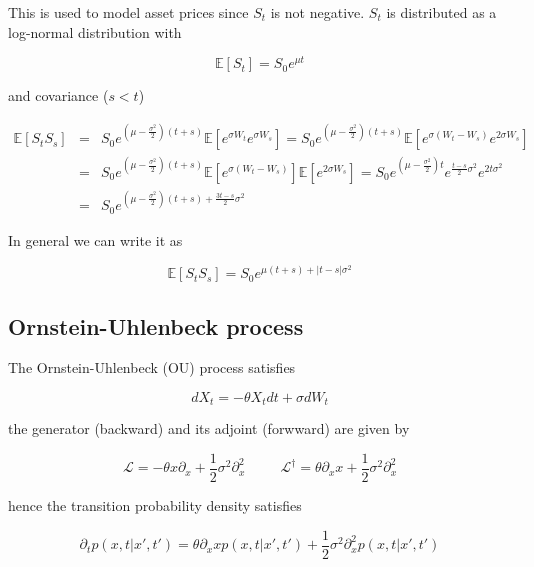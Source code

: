 \documentclass[11pt,a4paper]{article}
\begin{document}
This is used to model asset prices since $S_t$ is not negative. $S_t$ is distributed as a log-normal distribution with 

\begin{equation}
    \mathbb{E}[S_t] = S_0e^{\mu t}
\end{equation}

and covariance ($s<t$)

\begin{eqnarray}
    \mathbb{E}[S_tS_s] &=& S_0 e^{(\mu- \frac{\sigma^2}{2})(t+s)}\mathbb{E}[e^{\sigma W_t}e^{\sigma W_s}] = S_0e^{(\mu- \frac{\sigma^2}{2})(t+s)}\mathbb{E}[e^{\sigma(W_t-W_s)}e^{2\sigma W_s}] \nonumber \\
    &=&  S_0e^{(\mu- \frac{\sigma^2}{2})(t+s)}\mathbb{E}[e^{\sigma(W_t-W_s)}]\mathbb{E}[e^{2\sigma W_s}] = S_0e^{(\mu- \frac{\sigma^2}{2})t}e^{\frac{t-s}{2}\sigma^2}e^{2t\sigma^2} \\ \nonumber
    &=& S_0e^{(\mu-\frac{\sigma^2}{2})(t+s)+\frac{3t-s}{2}\sigma^2}
\end{eqnarray}

In general we can write it as

\begin{equation}
    \mathbb{E}[S_tS_s] = S_0e^{\mu(t+s)+|t-s|\sigma^2}
\end{equation}


\subsection{Ornstein-Uhlenbeck process}

The Ornstein-Uhlenbeck (OU) process satisfies

\begin{equation}
    dX_t = -\theta X_tdt +  \sigma dW_t
\end{equation}

the generator (backward) and its adjoint (forwward) are given by

\begin{equation}
    \mathcal{L} = -\theta x \partial_x + \frac{1}{2}\sigma^2\partial^2_x \hspace{30pt} \mathcal{L}^{\dagger} = \theta \partial_x x + \frac{1}{2}\sigma^2\partial^2_x
\end{equation}

hence the transition probability density satisfies

\begin{equation}
\partial_tp(x,t|x',t') = \theta \partial_x xp(x,t|x',t') + \frac{1}{2}\sigma^2\partial^2_x p(x,t|x',t')    
\end{equation}
\end{document}
